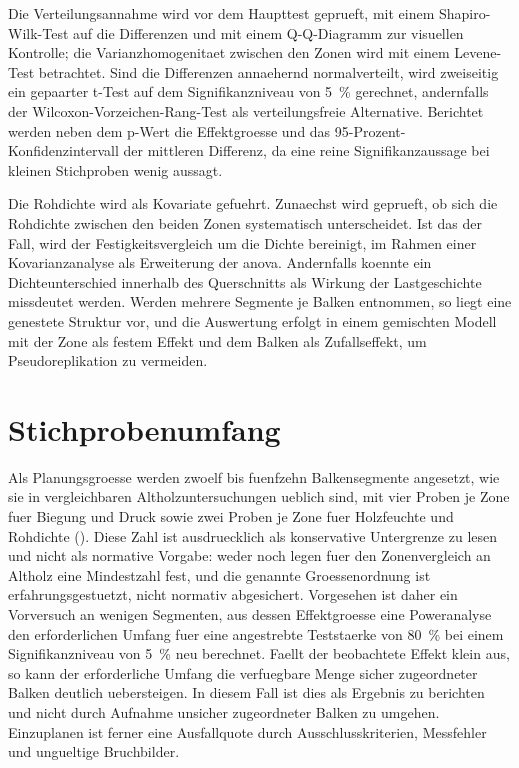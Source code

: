Die Verteilungsannahme wird vor dem Haupttest geprueft, mit einem
Shapiro-Wilk-Test auf die Differenzen und mit einem Q-Q-Diagramm zur
visuellen Kontrolle; die Varianzhomogenitaet zwischen den Zonen wird mit einem
Levene-Test betrachtet. Sind die Differenzen annaehernd normalverteilt, wird
zweiseitig ein gepaarter t-Test auf dem Signifikanzniveau von
\SI{5}{\percent} gerechnet, andernfalls der Wilcoxon-Vorzeichen-Rang-Test als
verteilungsfreie Alternative. Berichtet werden neben dem p-Wert die
Effektgroesse und das 95-Prozent-Konfidenzintervall der mittleren Differenz,
da eine reine Signifikanzaussage bei kleinen Stichproben wenig aussagt.

Die Rohdichte wird als Kovariate gefuehrt. Zunaechst wird geprueft, ob sich die
Rohdichte zwischen den beiden Zonen systematisch unterscheidet. Ist das der
Fall, wird der Festigkeitsvergleich um die Dichte bereinigt, im Rahmen einer
Kovarianzanalyse als Erweiterung der \acrshort{anova}. Andernfalls koennte ein
Dichteunterschied innerhalb des Querschnitts als Wirkung der Lastgeschichte
missdeutet werden. Werden mehrere Segmente je Balken entnommen, so liegt eine
genestete Struktur vor, und die Auswertung erfolgt in einem gemischten Modell
mit der Zone als festem Effekt und dem Balken als Zufallseffekt, um
Pseudoreplikation zu vermeiden.

\section{Stichprobenumfang}
\label{sec:stichprobenumfang}

Als Planungsgroesse werden zwoelf bis fuenfzehn Balkensegmente angesetzt, wie
sie in vergleichbaren Altholzuntersuchungen ueblich sind, mit vier Proben je
Zone fuer Biegung und Druck
sowie zwei Proben je Zone fuer Holzfeuchte und Rohdichte
(). Diese Zahl ist ausdruecklich als konservative
Untergrenze zu lesen und nicht als normative Vorgabe: weder
\textcite{en384} noch \textcite{din52185} legen fuer den Zonenvergleich an
Altholz eine Mindestzahl fest, und die genannte Groessenordnung ist
erfahrungsgestuetzt, nicht normativ abgesichert. Vorgesehen ist daher ein Vorversuch an wenigen Segmenten, aus dessen
Effektgroesse eine Poweranalyse den erforderlichen Umfang fuer eine
angestrebte Teststaerke von \SI{80}{\percent} bei einem Signifikanzniveau von
\SI{5}{\percent} neu berechnet. Faellt der beobachtete Effekt klein aus, so
kann der erforderliche Umfang die verfuegbare Menge sicher zugeordneter Balken
deutlich uebersteigen. In diesem Fall ist dies als Ergebnis zu berichten und
nicht durch Aufnahme unsicher zugeordneter Balken zu umgehen. Einzuplanen ist
ferner eine Ausfallquote durch Ausschlusskriterien, Messfehler und ungueltige
Bruchbilder.

